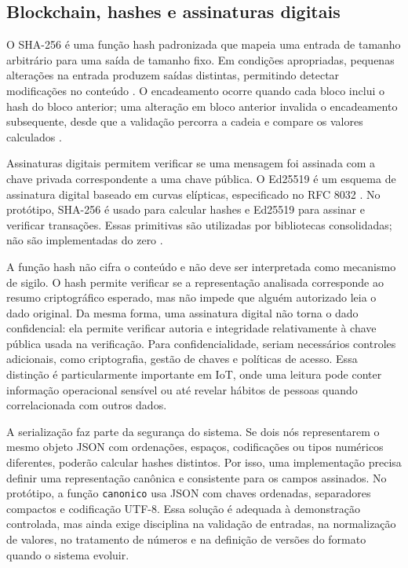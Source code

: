 \documentclass[10pt,a4paper,twocolumn]{article}
\begin{document}
\subsection{Blockchain, hashes e assinaturas digitais}
O SHA-256 é uma função hash padronizada que mapeia uma entrada de tamanho arbitrário para uma saída de tamanho fixo. Em condições apropriadas, pequenas alterações na entrada produzem saídas distintas, permitindo detectar modificações no conteúdo \cite{FIPS1804}. O encadeamento ocorre quando cada bloco inclui o hash do bloco anterior; uma alteração em bloco anterior invalida o encadeamento subsequente, desde que a validação percorra a cadeia e compare os valores calculados \cite{Nakamoto2008,Yaga2018}.

Assinaturas digitais permitem verificar se uma mensagem foi assinada com a chave privada correspondente a uma chave pública. O Ed25519 é um esquema de assinatura digital baseado em curvas elípticas, especificado no RFC 8032 \cite{Josefsson2017}. No protótipo, SHA-256 é usado para calcular hashes e Ed25519 para assinar e verificar transações. Essas primitivas são utilizadas por bibliotecas consolidadas; não são implementadas do zero \cite{CryptographyEd25519}.


A função hash não cifra o conteúdo e não deve ser interpretada como mecanismo de sigilo. O hash permite verificar se a representação analisada corresponde ao resumo criptográfico esperado, mas não impede que alguém autorizado leia o dado original. Da mesma forma, uma assinatura digital não torna o dado confidencial: ela permite verificar autoria e integridade relativamente à chave pública usada na verificação. Para confidencialidade, seriam necessários controles adicionais, como criptografia, gestão de chaves e políticas de acesso. Essa distinção é particularmente importante em IoT, onde uma leitura pode conter informação operacional sensível ou até revelar hábitos de pessoas quando correlacionada com outros dados.

A serialização faz parte da segurança do sistema. Se dois nós representarem o mesmo objeto JSON com ordenações, espaços, codificações ou tipos numéricos diferentes, poderão calcular hashes distintos. Por isso, uma implementação precisa definir uma representação canônica e consistente para os campos assinados. No protótipo, a função \texttt{canonico} usa JSON com chaves ordenadas, separadores compactos e codificação UTF-8. Essa solução é adequada à demonstração controlada, mas ainda exige disciplina na validação de entradas, na normalização de valores, no tratamento de números e na definição de versões do formato quando o sistema evoluir.
\end{document}
